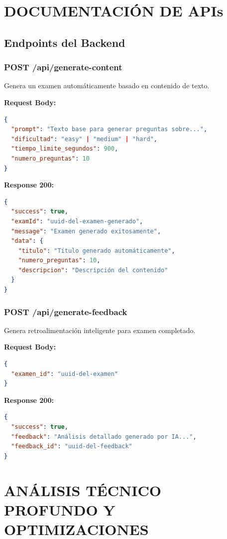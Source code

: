 \documentclass[12pt,a4paper]{report}
\begin{document}
\chapter{DOCUMENTACIÓN DE APIs}

\section{Endpoints del Backend}

\subsection{POST /api/generate-content}

Genera un examen automáticamente basado en contenido de texto.

\textbf{Request Body:}
\begin{lstlisting}[language=json, caption=Estructura de request para generación]
{
  "prompt": "Texto base para generar preguntas sobre...",
  "dificultad": "easy" | "medium" | "hard",
  "tiempo_limite_segundos": 900,
  "numero_preguntas": 10
}
\end{lstlisting}

\textbf{Response 200:}
\begin{lstlisting}[language=json, caption=Respuesta exitosa de generación]
{
  "success": true,
  "examId": "uuid-del-examen-generado",
  "message": "Examen generado exitosamente",
  "data": {
    "titulo": "Título generado automáticamente",
    "numero_preguntas": 10,
    "descripcion": "Descripción del contenido"
  }
}
\end{lstlisting}

\subsection{POST /api/generate-feedback}

Genera retroalimentación inteligente para examen completado.

\textbf{Request Body:}
\begin{lstlisting}[language=json]
{
  "examen_id": "uuid-del-examen"
}
\end{lstlisting}

\textbf{Response 200:}
\begin{lstlisting}[language=json]
{
  "success": true,
  "feedback": "Análisis detallado generado por IA...",
  "feedback_id": "uuid-del-feedback"
}
\end{lstlisting}

\chapter{ANÁLISIS TÉCNICO PROFUNDO Y OPTIMIZACIONES}
\end{document}
